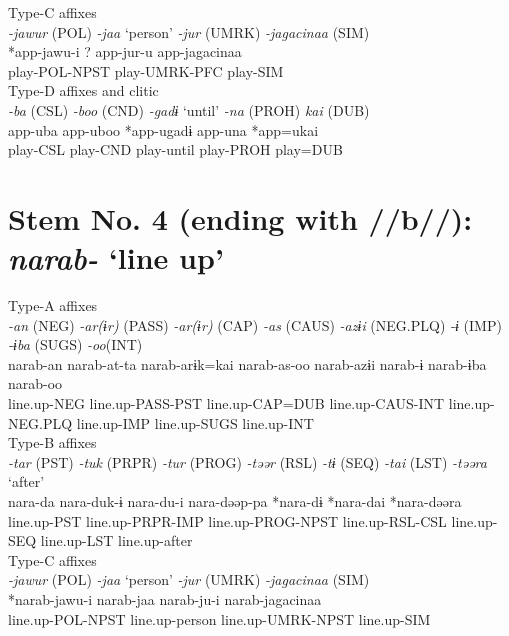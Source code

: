 \ex Type-C affixes\\
\glll \textit{-jawur} (POL)  \textit{-jaa} ‘person’  \textit{-jur} (UMRK)  \textit{-jagacinaa} (SIM)\\
*app-jawu-i  ?  app-jur-u  app-jagacinaa\\
play-POL-NPST    play-UMRK-PFC  play-SIM\\


\ex Type-D affixes and clitic\\
\glll \textit{-ba} (CSL)  \textit{-boo} (CND)  \textit{-gadɨ} ‘until’  \textit{-na} (PROH)  \textit{kai} (DUB)\\
app-uba  app-uboo  *app-ugadɨ  app-una  *app=ukai\\
play-CSL  play-CND  play-until  play-PROH  play=DUB\\
\z

\section{Stem No. 4 (ending with //b//): \textit{narab-} ‘line up’}

\ea Type-A affixes\\
\glll \textit{-an} (NEG)  \textit{-ar(ɨr)} (PASS)  \textit{-ar(ɨr)} (CAP)  \textit{-as} (CAUS)  \textit{-azɨi} (NEG.PLQ)  \textit{-ɨ} (IMP)  \textit{-ɨba} (SUGS)  \textit{-oo}(INT)\\
narab-an  narab-at-ta  narab-arɨk=kai  narab-as-oo  narab-azɨi  narab-ɨ  narab-ɨba  narab-oo\\
line.up-NEG  line.up-PASS-PST  line.up-CAP=DUB  line.up-CAUS-INT  line.up-NEG.PLQ  line.up-IMP  line.up-SUGS  line.up-INT\\


\ex Type-B affixes\\
\glll \textit{-tar} (PST)  \textit{-tuk} (PRPR)  \textit{-tur} (PROG)  \textit{-təər} (RSL)  \textit{-tɨ} (SEQ)  \textit{-tai} (LST)  \textit{-təəra} ‘after’\\
nara-da  nara-duk-ɨ  nara-du-i  nara-dəəp-pa  *nara-dɨ  *nara-dai  *nara-dəəra\\
line.up-PST  line.up-PRPR-IMP  line.up-PROG-NPST  line.up-RSL-CSL  line.up-SEQ  line.up-LST  line.up-after\\


\ex Type-C affixes\\
\glll \textit{-jawur} (POL)  \textit{-jaa} ‘person’  \textit{-jur} (UMRK)  \textit{-jagacinaa} (SIM)\\
*narab-jawu-i  narab-jaa  narab-ju-i  narab-jagacinaa\\
line.up-POL-NPST  line.up-person  line.up-UMRK-NPST  line.up-SIM\\


